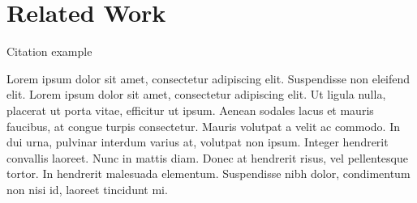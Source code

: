 \section{Related Work} \label{sec:related_work}
 Citation example \cite{costante2015exploring}
 
  Lorem ipsum dolor sit amet, consectetur adipiscing elit. Suspendisse non eleifend elit. Lorem ipsum dolor sit amet, consectetur adipiscing elit. Ut ligula nulla, placerat ut porta vitae, efficitur ut ipsum. Aenean sodales lacus et mauris faucibus, at congue turpis consectetur. Mauris volutpat a velit ac commodo. In dui urna, pulvinar interdum varius at, volutpat non ipsum. Integer hendrerit convallis laoreet. Nunc in mattis diam. Donec at hendrerit risus, vel pellentesque tortor. In hendrerit malesuada elementum. Suspendisse nibh dolor, condimentum non nisi id, laoreet tincidunt mi.
  
  